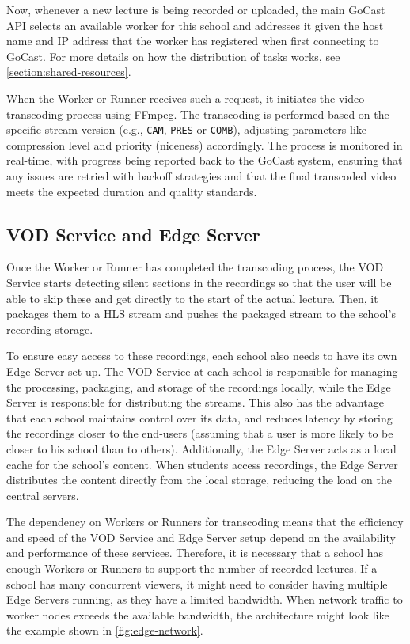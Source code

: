 Now, whenever a new lecture is being recorded or uploaded, the main GoCast \ac{API} selects an available worker for this school and addresses it given the host name and IP address that the worker has registered when first connecting to GoCast. For more details on how the distribution of tasks works, see \autoref{section:shared-resources}.

When the Worker or Runner receives such a request, it initiates the video transcoding process using FFmpeg. The transcoding is performed based on the specific stream version (e.g., \texttt{CAM}, \texttt{PRES} or \texttt{COMB}), adjusting parameters like compression level and priority (niceness) accordingly. The process is monitored in real-time, with progress being reported back to the GoCast system, ensuring that any issues are retried with backoff strategies and that the final transcoded video meets the expected duration and quality standards.

\subsection{VOD Service and Edge Server}

Once the Worker or Runner has completed the transcoding process, the VOD Service starts detecting silent sections in the recordings so that the user will be able to skip these and get directly to the start of the actual lecture. Then, it packages them to a \ac{HLS} stream and pushes the packaged stream to the school's recording storage.

To ensure easy access to these recordings, each school also needs to have its own Edge Server set up. The VOD Service at each school is responsible for managing the processing, packaging, and storage of the recordings locally, while the Edge Server is responsible for distributing the streams. This also has the advantage that each school maintains control over its data, and reduces latency by storing the recordings closer to the end-users (assuming that a user is more likely to be closer to his school than to others).
Additionally, the Edge Server acts as a local cache for the school's content. When students access recordings, the Edge Server distributes the content directly from the local storage, reducing the load on the central servers.

The dependency on Workers or Runners for transcoding means that the efficiency and speed of the VOD Service and Edge Server setup depend on the availability and performance of these services. Therefore, it is necessary that a school has enough Workers or Runners to support the number of recorded lectures.
If a school has many concurrent viewers, it might need to consider having multiple Edge Servers running, as they have a limited bandwidth. %
When network traffic to worker nodes exceeds the available bandwidth, the architecture might look like the example shown in \autoref{fig:edge-network}.

